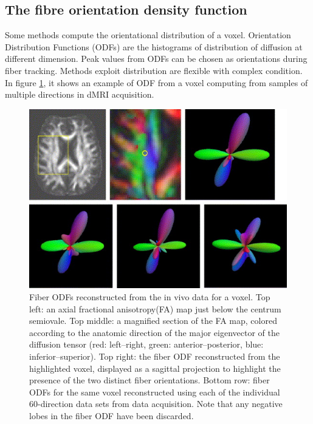 \subsection{The fibre orientation density function}

Some methods compute the orientational distribution of a voxel. 
Orientation Distribution Functions (ODFs) are the histograms of distribution of diffusion at different dimension. 
Peak values from ODFs can be chosen as orientations during fiber tracking. Methods exploit distribution are flexible with complex condition.
In figure \ref*{fig:odf}, it shows an example of ODF from a voxel computing from samples of multiple directions in dMRI acquisition.

\begin{figure}[ht]
    \centering
    \includegraphics[width= 12cm]{figures/odf.jpg}
        \caption{Fiber ODFs reconstructed from the in vivo data for a voxel.
          Top left: an axial fractional anisotropy(FA) map just below the centrum semiovale. 
          Top middle: a magnified section of the FA map, colored according to the anatomic direction of the major eigenvector of the diffusion tensor 
          (red: left–right, green: anterior–posterior, blue: inferior–superior). 
          Top right: the fiber ODF reconstructed from the highlighted voxel, 
          displayed as a sagittal projection to highlight the presence of the two distinct fiber orientations. 
          Bottom row: fiber ODFs for the same voxel reconstructed using each of the individual 60-direction data sets from data acquisition.
          Note that any negative lobes in the fiber ODF have been discarded. \cite*[]{tournierDirectEstimationFiber2004}
        }
    \label{fig:odf}
\end{figure}

